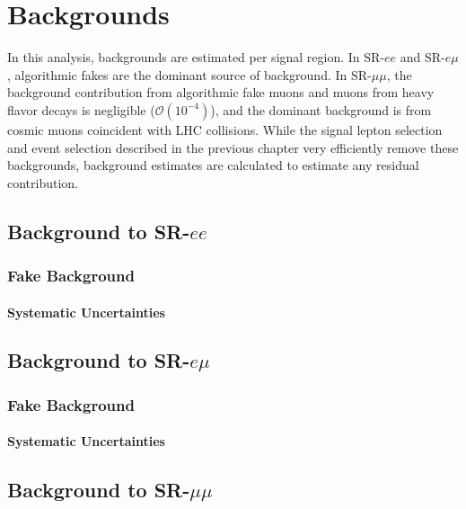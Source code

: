 \chapter{Backgrounds}

In this analysis, backgrounds are estimated per signal region. In SR-$ee$ and SR-$e\mu$, algorithmic fakes are the dominant source of background. In SR-$\mu\mu$, the background contribution from algorithmic fake muons and muons from heavy flavor decays is negligible ($\mathcal{O}(10^{-4})$), and the dominant background is from cosmic muons coincident with \ac{LHC} collisions. While the signal lepton selection and event selection described in the previous chapter very efficiently remove these backgrounds, background estimates are calculated to estimate any residual contribution. 


\section{Background to SR-$ee$}
\subsection{Fake Background}
\subsubsection{Systematic Uncertainties}

\section{Background to SR-$e\mu$}
\subsection{Fake Background}
\subsubsection{Systematic Uncertainties}

\section{Background to SR-$\mu\mu$}

